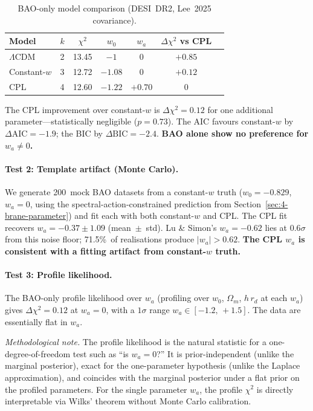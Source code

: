\begin{table}[htbp]
\centering
\caption{BAO-only model comparison (DESI~DR2, Lee~2025 covariance).}
\label{tab:2-wa-bao}
\begin{tabular}{lcccccc}
\toprule
Model & $k$ & $\chi^2$ & $w_0$ & $w_a$ & $\Delta\chi^2$ vs CPL \\
\midrule
$\Lambda$CDM & 2 & 13.45 & $-1$ & $0$ & $+0.85$ \\
Constant-$w$ & 3 & 12.72 & $-1.08$ & $0$ & $+0.12$ \\
CPL & 4 & 12.60 & $-1.22$ & $+0.70$ & $0$ \\
\bottomrule
\end{tabular}
\end{table}

The CPL improvement over constant-$w$ is $\Delta\chi^2 = 0.12$ for one additional parameter---statistically negligible ($p = 0.73$). The AIC favours constant-$w$ by $\Delta\mathrm{AIC} = -1.9$; the BIC by $\Delta\mathrm{BIC} = -2.4$. \textbf{BAO alone show no preference for $w_a \neq 0$.}

\paragraph{Test 2: Template artifact (Monte Carlo).}
We generate 200~mock BAO datasets from a constant-$w$ truth ($w_0 = -0.829$, $w_a = 0$, using the spectral-action-constrained prediction from Section~\ref{sec:4-brane-parameter}) and fit each with both constant-$w$ and CPL. The CPL fit recovers $w_a = -0.37 \pm 1.09$ (mean~$\pm$~std). Lu \& Simon's $w_a = -0.62$ lies at $0.6\sigma$ from this noise floor; 71.5\%~of realisations produce $|w_a| > 0.62$. \textbf{The CPL $w_a$ is consistent with a fitting artifact from constant-$w$ truth.}

\paragraph{Test 3: Profile likelihood.}
The BAO-only profile likelihood over $w_a$ (profiling over $w_0$, $\Omega_m$, $h\,r_d$ at each $w_a$) gives $\Delta\chi^2 = 0.12$ at $w_a = 0$, with a $1\sigma$ range $w_a \in [-1.2,\,+1.5]$. The data are essentially flat in $w_a$.

\emph{Methodological note.} The profile likelihood is the natural statistic for a one-degree-of-freedom test such as ``is $w_a = 0$?'' It is prior-independent (unlike the marginal posterior), exact for the one-parameter hypothesis (unlike the Laplace approximation), and coincides with the marginal posterior under a flat prior on the profiled parameters. For the single parameter $w_a$, the profile $\chi^2$ is directly interpretable via Wilks' theorem without Monte Carlo calibration.

